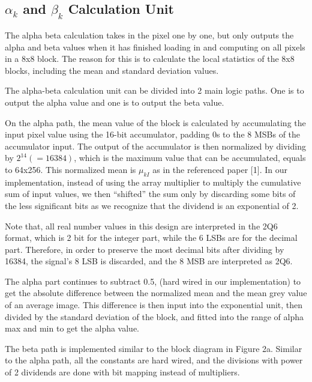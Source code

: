 \documentclass[letterpaper, 11pt]{article}
\begin{document}
	\subsection{$\alpha_k$ and $\beta_k$ Calculation Unit}
	\label{subsec:akbk}
	
	The alpha beta calculation takes in the pixel one by one, but only outputs the alpha and beta values when it has finished loading in and computing on all pixels in a 8x8 block. The reason for this is to calculate the local statistics of the 8x8 blocks, including the mean and standard deviation values.
	
	The alpha-beta calculation unit can be divided into 2 main logic paths. One is to output the alpha value and one is to output the beta value. 
	
	On the alpha path, the mean value of the block is calculated by accumulating the input pixel value using the 16-bit accumulator, padding 0s to the 8 MSBs of the accumulator input. The output of the accumulator is then normalized by dividing by $2^{14} (= 16384)$, which is the maximum value that can be accumulated, equals to 64x256. This normalized mean is $\mu_{kI}$ as in the referenced paper [1]. In our implementation, instead of using the array  multiplier to multiply the cumulative sum of input values, we then “shifted” the sum only by discarding some bits of the less significant bits as we recognize that the dividend is an exponential of 2. 
	
	Note that, all real number values in this design are interpreted in the 2Q6 format, which is 2 bit for the integer part, while the 6 LSBs are for the decimal part. Therefore, in order to preserve the most decimal bits after dividing by 16384, the signal's 8 LSB is discarded, and the 8 MSB are interpreted as 2Q6.
	
	The alpha part continues to subtract 0.5, (hard wired in our implementation) to get the absolute difference between the normalized mean and the mean grey value of an average image. This difference is then input into the exponential unit, then divided by the standard deviation of the block, and fitted into the range of alpha max and min to get the alpha value.
	
	The beta path is implemented similar to the block diagram in Figure 2a. Similar to the alpha path, all the constants are hard wired, and the divisions with power of 2 dividends are done with bit mapping instead of multipliers.
	
\end{document}
